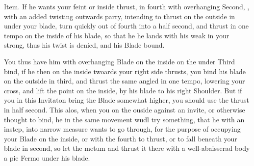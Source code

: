 \newpage


\newpage

Item. If he wants your feint or inside thrust, in fourth with
overhanging Second, , with an
added twisting outwards parry, intending to thrust on the outside in
under your blade, turn quickly out of fourth into a half second, and
thrust in one tempo on the inside of his blade, so that he he lands
with his weak in your strong, thus his twist is denied, and his Blade bound.

You thus have him with overhanging Blade on the inside on the under
Third bind, if he then on the inside twoards your right side thrusts,
you bind his blade on the outside in third, and thrust the same angled
in one tempo, lowering your cross, and lift the point on the inside,
by his blade to his right Shoulder. But if you in this Invitaton bring
the Blade somewhat higher, you should use the thrust in half
second. This alos, when you on the ouside against an invite, or
otherwise thought to bind, he in the same movement wudl try something,
that he with an instep, into narrow measure wants to go through, for
the purpose of occupying your Blade on the inside, or with the fourth
to thrust, or to fall beneath your blade in second, so let the
metum and thrust it there with a
well-abaisserad body a pie Fermo under his blade.

